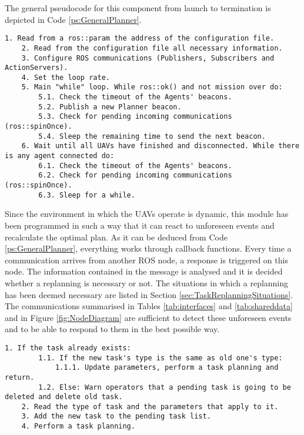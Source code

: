 The general pseudocode for this component from launch to termination is depicted in Code \ref{ps:GeneralPlanner}.

\begin{lstlisting}[caption={General operation of \emph{High-Level Planner}'s code}, breaklines=true, label=ps:GeneralPlanner]
	1. Read from a ros::param the address of the configuration file.
	2. Read from the configuration file all necessary information.
	3. Configure ROS communications (Publishers, Subscribers and ActionServers).
	4. Set the loop rate.
	5. Main "while" loop. While ros::ok() and not mission over do:
		5.1. Check the timeout of the Agents' beacons.
		5.2. Publish a new Planner beacon.
		5.3. Check for pending incoming communications (ros::spinOnce).
		5.4. Sleep the remaining time to send the next beacon.
	6. Wait until all UAVs have finished and disconnected. While there is any agent connected do:
		6.1. Check the timeout of the Agents' beacons.
		6.2. Check for pending incoming communications (ros::spinOnce).
		6.3. Sleep for a while.
\end{lstlisting}

Since the environment in which the \glspl{UAV} operate is dynamic, this module has been programmed in such a way that it can react to unforeseen events and recalculate the optimal plan. As it can be deduced from Code \ref{ps:GeneralPlanner}, everything works through callback functions. Every time a communication arrives from another ROS node, a response is triggered on this node. The information contained in the message is analysed and it is decided whether a replanning is necessary or not. The situations in which a replanning has been deemed necessary are listed in Section \ref{sec:TaskReplanningSituations}. The communications summarised in Tables \ref{tab:interfaces} and \ref{tab:shareddata} and in Figure \ref{fig:NodeDiagram} are sufficient to detect these unforeseen events and to be able to respond to them in the best possible way.

\begin{lstlisting}[caption={Task callback pseudocode}, breaklines=true, label=ps:IncomingTask]
	1. If the task already exists:
		1.1. If the new task's type is the same as old one's type:
			1.1.1. Update parameters, perform a task planning and return.
		1.2. Else: Warn operators that a pending task is going to be deleted and delete old task.
	2. Read the type of task and the parameters that apply to it.
	3. Add the new task to the pending task list.
	4. Perform a task planning.
\end{lstlisting}

